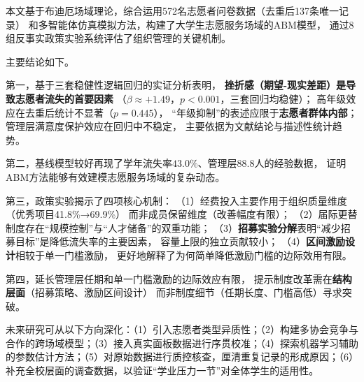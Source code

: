 \documentclass[12pt,a4paper]{article}
\begin{document}
本文基于布迪厄场域理论，综合运用572名志愿者问卷数据（去重后137条唯一记录）
和多智能体仿真模拟方法，构建了大学生志愿服务场域的ABM模型，
通过8组反事实政策实验系统评估了组织管理的关键机制。

主要结论如下。

第一，基于三套稳健性逻辑回归的实证分析表明，
\textbf{挫折感（期望-现实差距）是导致志愿者流失的首要因素}
（$\beta\approx+1.49$，$p<0.001$，三套回归均稳健）；
高年级效应在去重后统计不显著（$p=0.445$），
“年级抑制”的表述应限于\textbf{志愿者群体内部}；
管理层满意度保护效应在回归中不稳定，
主要依据为文献结论与描述性统计趋势。

第二，基线模型较好再现了学年流失率$43.0\%$、管理层88.8人的经验数据，
证明ABM方法能够有效建模志愿服务场域的复杂动态。

第三，政策实验揭示了四项核心机制：
（1）经费投入主要作用于组织质量维度（优秀项目41.8\%→69.9\%）
而非成员保留维度（改善幅度有限）；
（2）届际更替制度存在“规模控制”与“人才储备”的双重功能；
（3）\textbf{招募实验分解}表明“减少招募目标”是降低流失率的主要因素，
容量上限的独立贡献较小；
（4）\textbf{区间激励设计}相较于单一门槛激励，
更好地解释了为何简单降低激励门槛的边际效用有限。

第四，延长管理层任期和单一门槛激励的边际效应有限，
提示制度改革需在\textbf{结构层面}（招募策略、激励区间设计）
而非制度细节（任期长度、门槛高低）寻求突破。

未来研究可从以下方向深化：（1）引入志愿者类型异质性；（2）构建多协会竞争与合作的跨场域模型；（3）接入真实面板数据进行序贯校准；（4）探索机器学习辅助的参数估计方法；（5）对原始数据进行质控核查，厘清重复记录的形成原因；（6）补充全校层面的调查数据，以验证“学业压力一节”对全体学生的适用性。
\end{document}

